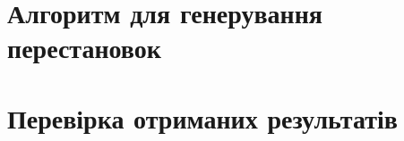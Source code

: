     \section{Алгоритм для генерування перестановок}
    \section{Перевірка отриманих результатів}
%         
%     
\newpage
 

